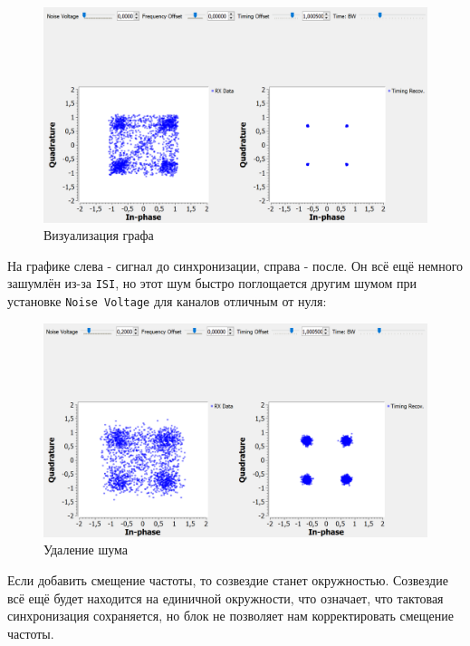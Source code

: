 \documentclass[a4paper,12pt]{report}
\begin{document}
\begin{figure}[H]
        \centering
        \includegraphics[width=1.0\textwidth]{17.png}
        \caption{Визуализация графа}
        \label{fig:lab12_fig3_11}
\end{figure}

На графике слева - сигнал до синхронизации, справа - после. Он всё ещё немного зашумлён из-за \texttt{ISI}, но этот шум быстро поглощается другим шумом при установке \texttt{Noise Voltage} для каналов отличным от нуля:

\begin{figure}[H]
        \centering
        \includegraphics[width=1.0\textwidth]{18.png}
        \caption{Удаление шума}
        \label{fig:lab12_fig3_12}
\end{figure}

Если добавить смещение частоты, то созвездие станет окружностью. Созвездие всё ещё будет находится на единичной окружности, что означает, что тактовая синхронизация сохраняется, но блок не позволяет нам корректировать смещение частоты.
\end{document}

